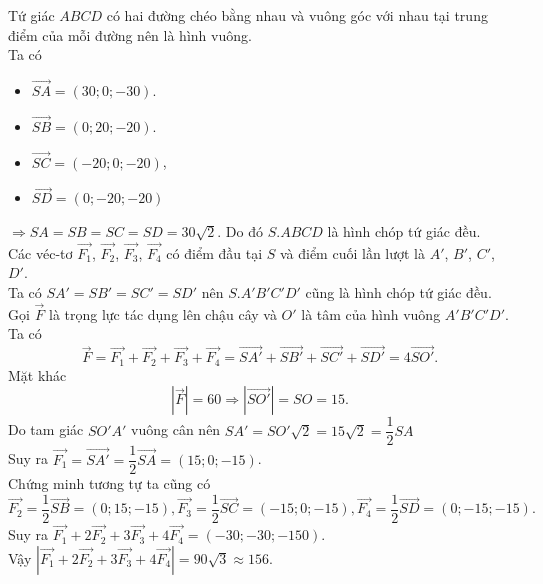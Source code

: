 \begin{ex}
{\begin{center}
	\end{center}
Tứ giác $ABCD$ có hai đường chéo bằng nhau và vuông góc với nhau tại trung điểm của mỗi đường nên là hình vuông.\\
Ta có
\begin{itemize}
	\item $\overrightarrow{SA}=\left(30;0;-30\right)$.
	\item $\overrightarrow{SB}=\left(0;20;-20\right)$.
	\item $\overrightarrow{SC}=\left(-20;0;-20\right)$,
	\item $\overrightarrow{SD}=\left(0;-20;-20\right)$
\end{itemize} 
$\Rightarrow SA=SB=SC=SD=30\sqrt{2}$. Do đó $S.ABCD$ là hình chóp tứ giác đều.\\
Các véc-tơ $\overrightarrow{F_1}$, $\overrightarrow{F_2}$, $\overrightarrow{F_3}$, $\overrightarrow{F_4}$ có điểm đầu tại $S$ và điểm cuối lần lượt là $A'$, $B'$, $C'$, $D'$.\\
Ta có $SA'=SB'=SC'=SD' $ nên $S.A'B'C'D'$ cũng là hình chóp tứ giác đều.\\
Gọi $\overrightarrow{F}$ là trọng lực tác dụng lên chậu cây và $O'$ là tâm của hình vuông $A'B'C'D'$. Ta có 
	\[\overrightarrow{F}=\overrightarrow{F_1}+\overrightarrow{F_2}+\overrightarrow{F_3}+\overrightarrow{F_4}=\overrightarrow{SA'}+\overrightarrow{SB'}+\overrightarrow{SC'}+\overrightarrow{SD'}=4\overrightarrow{SO'}.\]
Mặt khác
		\[\left|\overrightarrow{F}\right|=60\Rightarrow \left|\overrightarrow{SO'}\right|=SO=15.\]
		Do tam giác $SO'A'$ vuông cân nên $SA'=SO'\sqrt{2}=15\sqrt{2}=\dfrac{1}{2} SA$\\
		Suy ra $\overrightarrow{F_1}=\overrightarrow{SA'}=\dfrac{1}{2} \overrightarrow{SA}=\left(15;0;-15\right)$.\\
		Chứng minh tương tự ta cũng có
		\[\overrightarrow{F_2}=\dfrac{1}{2} \overrightarrow{SB}=\left(0;15;-15\right),\overrightarrow{F_3}=\dfrac{1}{2} \overrightarrow{SC}=\left(-15;0;-15\right),\overrightarrow{F_4}=\dfrac{1}{2} \overrightarrow{SD}=\left(0;-15;-15\right).
		\]
		Suy ra $\overrightarrow{F_1}+2\overrightarrow{F_2}+3\overrightarrow{F_3}+4\overrightarrow{F_4}=\left(-30;-30;-150\right)$.\\
		Vậy $ \left|\overrightarrow{F_1}+2\overrightarrow{F_2}+3\overrightarrow{F_3}+4\overrightarrow{F_4}\right|=90\sqrt{3} \approx 156$.
	}
\end{ex}


